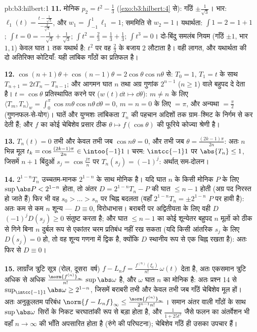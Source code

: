 \begin{solution}{pb:b3:hilbert:1}
\textbf{11.} मोनिक $p_2 = t^2 - \frac13$ (\cref{exo:b3:hilbert:4} से): गाँठें $\pm\frac1{\sqrt3}$। भार: $\ell_1(t) = \frac{t - \frac1{\sqrt3}}{-\frac2{\sqrt3}}$, और
$w_1 = \int_{-1}^1\ell_1 = 1$; सममिति से $w_2 = 1$। यथार्थता: $\int 1 = 2 = 1 + 1$; $\int t = 0 =
-\frac1{\sqrt3} + \frac1{\sqrt3}$; $\int t^2 = \frac23 =
\frac13 + \frac13$; $\int t^3 = 0$।
दो-बिंदु समलंब नियम (गाँठें $\pm1$, भार $1, 1$) केवल घात $1$ तक
यथार्थ है: $t^2$ पर वह $\frac23$ के बजाय $2$ लौटाता है। वही लागत, और
यथार्थता की दो अतिरिक्त कोटियाँ: यही लांबिक गाँठों का प्रतिफल है।

\textbf{12.} $\cos(n{+}1)\theta + \cos(n{-}1)\theta =
2\cos\theta\cos n\theta$ से: $T_0 = 1$, $T_1 = t$ के साथ $T_{n+1} = 2tT_n - T_{n-1}$; और आगमन घात $n$
तथा अग्र गुणांक $2^{n-1}$ ($n \geq 1$) वाले बहुपद दे देता है। $t = \cos\theta$ प्रतिस्थापित
करने पर ($w(t)\dd t \mapsto
\dd\theta$): $m
\neq n$ के लिए $\langle T_m, T_n\rangle_w =
\int_0^\pi\cos m\theta\cos n\theta\,\dd\theta = 0$, $m = n = 0$ के लिए $= \pi$, और अन्यथा
$= \frac\pi2$ (गुणनफल-से-योग)। घातें और युग्मशः लांबिकता $T_n$ की पहचान अदिशों
तक ग्राम--श्मिट के निर्गम से कर देती हैं; और $f$ का कोई चेबिशेव
प्रसार ठीक $\theta \mapsto f(\cos\theta)$ की फूरिये कोज्या श्रेणी है।

\textbf{13.} $T_n(t) = 0$ तभी और केवल तभी जब $\cos n\theta = 0$, और तभी जब $\theta = \frac{(2k-1)\pi}{2n}$: अतः
$n$ भिन्न मूल $t_k = \cos\frac{(2k-1)\pi}{2n} \in \intoo{-1}1$। चरम: $\intcc{-1}1$ पर $\abs{T_n} \leq 1$, जिसमें $n + 1$ बिंदुओं
$s_j = \cos\frac{j\pi}n$ पर $T_n(s_j) =
(-1)^j$: अर्थात्  सम-दोलन।

\textbf{14.} $2^{1-n}T_n$ उच्चतम-मानक $2^{1-n}$ के साथ मोनिक है। यदि घात $n$
के किसी मोनिक $P$ के लिए $\sup\abs P < 2^{1-n}$ होता, तो अंतर $D = 2^{1-n}T_n - P$ की घात $\leq n -
1$
होती (अग्र पद निरस्त हो जाते हैं) फिर भी वह $s_0 >
\dots > s_n$ पर चिह्न बदलता
(वहाँ $2^{1-n}T_n = \pm2^{1-n}$ $P$ पर हावी है): अतः कम से कम $n$ शून्य --- $D \equiv 0$,
विरोधाभास। बराबरी पर अद्वितीयता के लिए वही $D$ $(-1)^jD(s_j) \geq 0$ संतुष्ट करता
है; और घात $\leq
n-1$ का कोई शून्येतर बहुपद $n$ मूलों को ठीक से गिने
बिना $n$ दुर्बल रूप से एकांतर चरम प्रतिबंध नहीं रख सकता (यदि किसी
आंतरिक $s_j$ के लिए $D(s_j) = 0$ हो, तो वह शून्य गणना में द्विक है, क्योंकि
$D$ स्थानीय रूप से एक चिह्न रखता है): अतः फिर से $D
\equiv 0$।

\textbf{15.} लाग्राँज त्रुटि सूत्र (रोल, दूसरा~वर्ष) $f - L_nf = \frac{f^{(n)}(\xi_t)}{n!}\,\omega(t)$ देता है,
अतः एकसमान त्रुटि अधिक से अधिक $\frac{\norm{f^{(n)}}_\infty}
{n!}\,\sup\abs\omega$ है, और $\omega$ घात $n$ का मोनिक
है: अतः प्रश्न 14 से $\sup_{\intcc{-1}1}\abs\omega \geq 2^{1-n}$, जिसमें बराबरी तभी और केवल तभी जब गाँठें
चेबिशेव मूल हों। अतः अनुकूलतम परिबंध $\norm{f - L_nf}_\infty \leq
\frac{\norm{f^{(n)}}_\infty}{2^{n-1}n!}$। समान अंतर वाली गाँठों
के साथ $\sup\abs\omega$ सिरों के निकट चरघातांकी रूप से बड़ा होता है, और $\frac1{1 + 25t^2}$
जैसे फलन का अंतर्वेशन भी वहाँ $n \to \infty$ की भाँति अपसारित होता है (रुंगे
की परिघटना); चेबिशेव गाँठें ही उसका उपचार हैं।


\end{solution}
